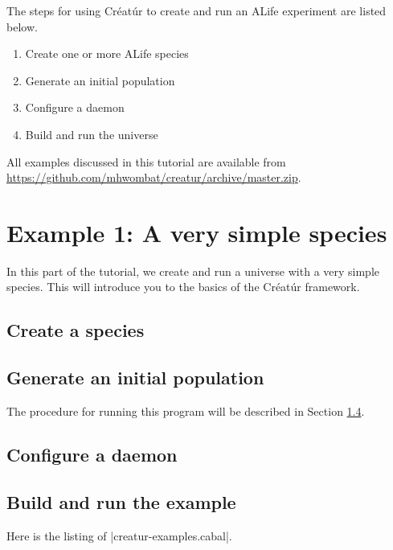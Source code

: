 \documentclass[a4paper,10pt]{report}
\begin{document}
The steps for using Créatúr to create and run an ALife experiment
are listed below.

\begin{enumerate}
\item Create one or more ALife species
\item Generate an initial population
\item Configure a daemon
\item Build and run the universe
\end {enumerate}

All examples discussed in this tutorial are available from
\url{https://github.com/mhwombat/creatur/archive/master.zip}.

\section{Example 1: A very simple species}
\label{sec:rock}

In this part of the tutorial, we create and run a universe
with a very simple species.
This will introduce you to the basics of the Créatúr framework.

\subsection{Create a species}
\label{sec:species1}



\subsection{Generate an initial population}
\label{sec:pop1}



The procedure for running this program will be described in Section 
\ref{sec:run1}.

\subsection{Configure a daemon}
\label{sec:daemon1}



\subsection{Build and run the example}
\label{sec:run1}


Here is the listing of |creatur-examples.cabal|.

\end{document}
